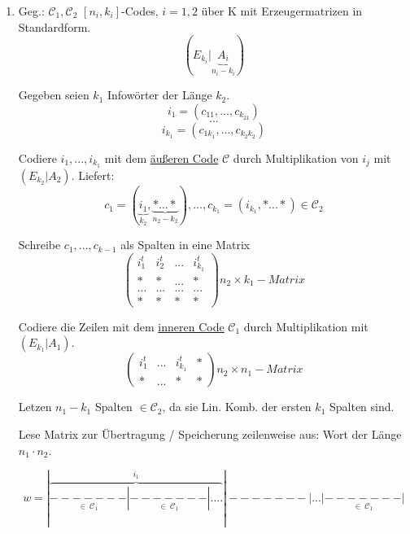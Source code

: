 \documentclass[a4paper, openany]{book}
\begin{document}
\begin{enumerate}[label=(\alph*)]
	\item Geg.: $\mathcal{C}_1, \mathcal{C}_2$ $[n_i, k_i]$-Codes, $i=1,2$ über K mit Erzeugermatrizen in Standardform. \[ (E_{k_i} | \underbrace{A_i}_{n_i - k_i}) \]

	Gegeben seien $k_1$ Infowörter der Länge $k_2$. \[ i_1 = (c_{11}, ..., c_{k_21}) \] \[ ... \] \[ i_{k_1} = (c_{1k_1}, ..., c_{k_2k_2}) \]

	Codiere $i_1, ..., i_{k_1}$ mit dem \underline{äußeren Code} $\mathcal{C}$ durch Multiplikation von $i_j $ mit $(E_{k_2} | A_2)$. Liefert: \[c_1 = (\underbrace{i_1}_{k_2},\underbrace{*...*}_{n_2-k_2}), ..., c_{k_1} = (i_{k_1}, *...*) \in \mathcal{C}_2 \]

	Schreibe $c_1, ..., c_{k-1}$ als Spalten in eine Matrix \[ \begin{pmatrix}i_1^t & i_2^t & ... & i_{k_1}^t \\ * & * & ... & * \\ ... & ... & ... & ... \\ * & * & * & * \end{pmatrix} n_2 \times k_1-Matrix \]

	Codiere die Zeilen mit dem \underline{inneren Code} $\mathcal{C}_1$ durch Multiplikation mit $(E_{k_1} | A_1)$. \[ \begin{pmatrix}i_1^t & ... & i_{k_1}^t & * \\ * & ... & * & * \end{pmatrix} n_2 \times n_1-Matrix\]

	Letzen $n_1-k_1$ Spalten $\in \mathcal{C_2}$, da sie Lin. Komb. der ersten $k_1$ Spalten sind. 

	\par \medskip

	Lese Matrix zur Übertragung / Speicherung zeilenweise aus: Wort der Länge $n_1 \cdot n_2$.

	\[ w =  |\overbrace{\underset{\in \ \mathcal{C}_1}{-------}|\underset{\in \ \mathcal{C}_1}{-------}|....}^{i_1}|-------|...|\underset{\in \ \mathcal{C}_1}{-------}| \]
\end{enumerate}
\end{document}
